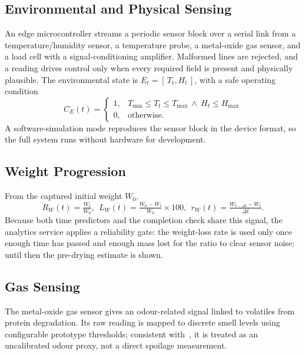 \documentclass[conference]{IEEEtran}
\begin{document}
\subsection{Environmental and Physical Sensing}
An edge microcontroller streams a periodic sensor block over a serial link
from a temperature/humidity sensor, a temperature probe, a metal-oxide gas
sensor, and a load cell with a signal-conditioning amplifier. Malformed
lines are rejected, and a reading drives control only when every required
field is present and physically plausible. The environmental state is
$E_{t}=[\,T_{t},H_{t}\,]$, with a safe operating condition
\begin{equation}
C_{E}(t) =
\begin{cases}
1, & T_{\min}\!\le\! T_{t}\!\le\! T_{\max}\ \wedge\ H_{t}\!\le\! H_{\max}\\
0, & \text{otherwise.}
\end{cases}\label{eq4}
\end{equation}
A software-simulation mode reproduces the sensor block in the device
format, so the full system runs without hardware for development.

\subsection{Weight Progression}
From the captured initial weight $W_{0}$,
\begin{equation}
R_{W}(t)=\tfrac{W_{t}}{W_{0}},\ \
L_{W}(t)=\tfrac{W_{0}-W_{t}}{W_{0}}\!\times\!100,\ \
r_{W}(t)=\tfrac{W_{t-\Delta t}-W_{t}}{\Delta t}.\label{eq5}
\end{equation}
Because both time predictors and the completion check share this signal,
the analytics service applies a reliability gate: the weight-loss rate is
used only once enough time has passed and enough mass lost for the ratio
to clear sensor noise; until then the pre-drying estimate is shown.

\subsection{Gas Sensing}
The metal-oxide gas sensor gives an odour-related signal linked to
volatiles from protein degradation. Its raw reading is mapped to discrete
smell levels using configurable prototype thresholds; consistent
with~\cite{b8}, it is treated as an uncalibrated odour proxy, not a direct
spoilage measurement.
\end{document}
